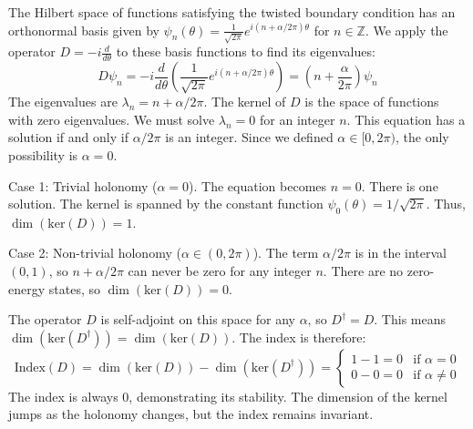 \begin{solution}
    The Hilbert space of functions satisfying the twisted boundary condition has an orthonormal basis given by $\psi_n(\theta) = \frac{1}{\sqrt{2\pi}}e^{i(n+\alpha/2\pi)\theta}$ for $n \in \mathbb{Z}$.
    We apply the operator $D = -i\frac{d}{d\theta}$ to these basis functions to find its eigenvalues:
    \begin{equation*}
        D\psi_n = -i \frac{d}{d\theta} \left( \frac{1}{\sqrt{2\pi}}e^{i(n+\alpha/2\pi)\theta} \right) = \left(n+\frac{\alpha}{2\pi}\right) \psi_n
    \end{equation*}
    The eigenvalues are $\lambda_n = n+\alpha/2\pi$.
    The kernel of $D$ is the space of functions with zero eigenvalues. We must solve $\lambda_n = 0$ for an integer $n$.
    This equation has a solution if and only if $\alpha/2\pi$ is an integer.
    Since we defined $\alpha \in [0, 2\pi)$, the only possibility is $\alpha=0$.
    
    Case 1: Trivial holonomy ($\alpha=0$).
    The equation becomes $n=0$. There is one solution. The kernel is spanned by the constant function $\psi_0(\theta) = 1/\sqrt{2\pi}$. Thus, $\dim(\text{ker}(D)) = 1$.
    
    Case 2: Non-trivial holonomy ($\alpha \in (0, 2\pi)$).
    The term $\alpha/2\pi$ is in the interval $(0, 1)$, so $n+\alpha/2\pi$ can never be zero for any integer $n$. There are no zero-energy states, so $\dim(\text{ker}(D)) = 0$.
    
    The operator $D$ is self-adjoint on this space for any $\alpha$, so $D^\dagger = D$.
    This means $\dim(\text{ker}(D^\dagger)) = \dim(\text{ker}(D))$.
    The index is therefore:
    \begin{equation*}
        \text{Index}(D) = \dim(\text{ker}(D)) - \dim(\text{ker}(D^\dagger)) = \begin{cases} 1 - 1 = 0 & \text{if } \alpha=0 \\ 0 - 0 = 0 & \text{if } \alpha \neq 0 \end{cases}
    \end{equation*}
    The index is always 0, demonstrating its stability. The dimension of the kernel jumps as the holonomy changes, but the index remains invariant.
\end{solution}


